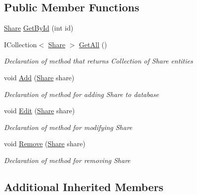 \subsection*{Public Member Functions}
\begin{DoxyCompactItemize}
\item 
\mbox{\hyperlink{class_gielda_l2_1_1_d_b_1_1_entities_1_1_share}{Share}} \mbox{\hyperlink{interface_gielda_l2_1_1_d_b_1_1_interfaces_1_1_i_share_repository_af252fb27ec646e120265e2f71c83677a}{Get\+By\+Id}} (int id)
\item 
I\+Collection$<$ \mbox{\hyperlink{class_gielda_l2_1_1_d_b_1_1_entities_1_1_share}{Share}} $>$ \mbox{\hyperlink{interface_gielda_l2_1_1_d_b_1_1_interfaces_1_1_i_share_repository_a5e13f8b06cb4711bb54137dabf783ed1}{Get\+All}} ()
\begin{DoxyCompactList}\small\item\em Declaration of method that returns Collection of Share entities \end{DoxyCompactList}\item 
void \mbox{\hyperlink{interface_gielda_l2_1_1_d_b_1_1_interfaces_1_1_i_share_repository_a92f21844eefac0604d9d195aa1f15214}{Add}} (\mbox{\hyperlink{class_gielda_l2_1_1_d_b_1_1_entities_1_1_share}{Share}} share)
\begin{DoxyCompactList}\small\item\em Declaration of method for adding Share to database \end{DoxyCompactList}\item 
void \mbox{\hyperlink{interface_gielda_l2_1_1_d_b_1_1_interfaces_1_1_i_share_repository_a68449340553ab4702be8f3559ea50131}{Edit}} (\mbox{\hyperlink{class_gielda_l2_1_1_d_b_1_1_entities_1_1_share}{Share}} share)
\begin{DoxyCompactList}\small\item\em Declaration of method for modifying Share \end{DoxyCompactList}\item 
void \mbox{\hyperlink{interface_gielda_l2_1_1_d_b_1_1_interfaces_1_1_i_share_repository_a270dc411526d961bac26e1df19ae2563}{Remove}} (\mbox{\hyperlink{class_gielda_l2_1_1_d_b_1_1_entities_1_1_share}{Share}} share)
\begin{DoxyCompactList}\small\item\em Declaration of method for removing Share \end{DoxyCompactList}\end{DoxyCompactItemize}
\subsection*{Additional Inherited Members}


